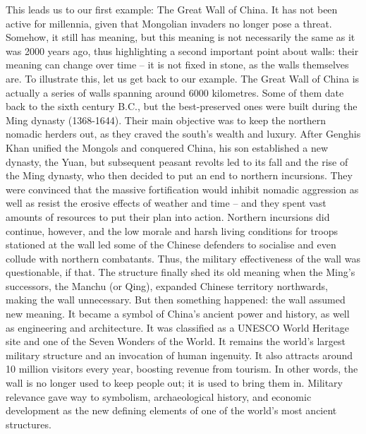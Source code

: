    This leads us to our first example: The Great Wall of China. It has not
   been active for millennia, given that Mongolian invaders no longer pose
   a threat. Somehow, it still has meaning, but this meaning is not
   necessarily the same as it was 2000 years ago, thus highlighting a
   second important point about walls: their meaning can change over time
   -- it is not fixed in stone, as the walls themselves are. To illustrate
   this, let us get back to our example. The Great Wall of China is
   actually a series of walls spanning around 6000 kilometres. Some of
   them date back to the sixth century B.C., but the best-preserved ones
   were built during the Ming dynasty (1368-1644). Their main objective
   was to keep the northern nomadic herders out, as they craved the
   south's wealth and luxury. After Genghis Khan unified the Mongols and
   conquered China, his son established a new dynasty, the Yuan, but
   subsequent peasant revolts led to its fall and the rise of the Ming
   dynasty, who then decided to put an end to northern incursions. They
   were convinced that the massive fortification would inhibit nomadic
   aggression as well as resist the erosive effects of weather and time --
   and they spent vast amounts of resources to put their plan into action.
   Northern incursions did continue, however, and the low morale and harsh
   living conditions for troops stationed at the wall led some of the
   Chinese defenders to socialise and even collude with northern
   combatants. Thus, the military effectiveness of the wall was
   questionable, if that. The structure finally shed its old meaning when
   the Ming's successors, the Manchu (or Qing), expanded Chinese territory
   northwards, making the wall unnecessary. But then something happened:
   the wall assumed new meaning. It became a symbol of China's ancient
   power and history, as well as engineering and architecture. It was
   classified as a UNESCO World Heritage site and one of the Seven Wonders
   of the World. It remains the world's largest military structure and an
   invocation of human ingenuity. It also attracts around 10 million
   visitors every year, boosting revenue from tourism. In other words, the
   wall is no longer used to keep people out; it is used to bring them in.
   Military relevance gave way to symbolism, archaeological history, and
   economic development as the new defining elements of one of the world's
   most ancient structures.

